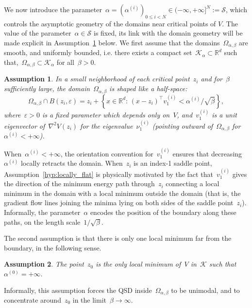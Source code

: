 \documentclass[a4]{article}
\newcommand{\R}{\mathbb{R}}
\newcommand{\1}{\mathbbm 1}
\newcommand{\epsLimit}[1]{\alpha^{(#1)}}
\newcommand{\hessEigvec}[2]{v^{(#1)}_{#2}} %
\newcommand{\hessEigval}[2]{\nu^{(#1)}_{#2}} %
\newtheorem{hypothesis}{Assumption}
\begin{document}
        We now introduce the parameter~$\alpha=\left(\epsLimit{i}\right)_{0\leq i < N}\in(-\infty,+\infty]^N := \mathcal S$, which controls the asymptotic geometry of the domains near critical points of $V$.
        The value of the parameter~$\alpha\in\mathcal S$ is fixed, its link with the domain geometry will be made explicit in Assumption~\ref{hyp:locally_flat} below. We first assume that the domains~$\Omega_{\alpha,\beta}$ are smooth, and uniformly bounded, i.e. there exists a compact set~$\mathcal K_\alpha\subset \R^d$ such that,~$\Omega_{\alpha,\beta} \subset \mathcal K_\alpha$ for all~$\beta>0$.
 
        \begin{hypothesis}
            \label{hyp:locally_flat}
            In a small neighborhood of each critical point~$z_i$ and for~$\beta$ sufficiently large, the domain~$\Omega_{\alpha,\beta}$ is shaped like a half-space:
            \begin{equation}
                \Omega_{\alpha,\beta} \cap B(z_i,\varepsilon) = z_i + \left\{x\in\R^d:\,(x-z_i)^\top\hessEigvec{i}{1} < \alpha^{(i)}/\sqrt\beta\right\},
            \end{equation}
            where~$\varepsilon>0$ is a fixed parameter which depends only on~$V$, and~$\hessEigvec{i}{1}$ is a unit eigenvector of~$\nabla^2 V(z_i)$ for the eigenvalue~$\hessEigval{i}{1}$ (pointing outward of~$\Omega_{\alpha,\beta}$ for~$\epsLimit{i}<+\infty$).
            \end{hypothesis}
        When~$\alpha^{(i)}<+\infty$, the orientation convention for~$\hessEigvec{i}{1}$ ensures that decreasing~$\alpha^{(i)}$ locally retracts the domain.
        When~$z_i$ is an index-1 saddle point, Assumption~\eqref{hyp:locally_flat} is physically motivated by the fact that~$\hessEigvec{i}{1}$ gives the direction of the minimum energy path through~$z_i$ connecting a local minimum in the domain with a local minimum outside the domain (that is, the gradient flow lines joining the minima lying on both sides of the saddle point~$z_i$). Informally, the parameter~$\alpha$ encodes the position of the boundary along these paths, on the length scale~$1/\sqrt\beta$.
        
        The second assumption is that there is only one local minimum far from the boundary, in the following sense.
        \begin{hypothesis}
            \label{hyp:one_min}
            The point~$z_0$ is the only local minimum of~$V$ in~$\mathcal K$ such that~$\epsLimit{0} = +\infty$.
        \end{hypothesis}
        Informally, this assumption forces the QSD inside~$\Omega_{\alpha,\beta}$ to be unimodal, and to concentrate around~$z_0$ in the limit~$\beta\to\infty$.
            
\end{document}
